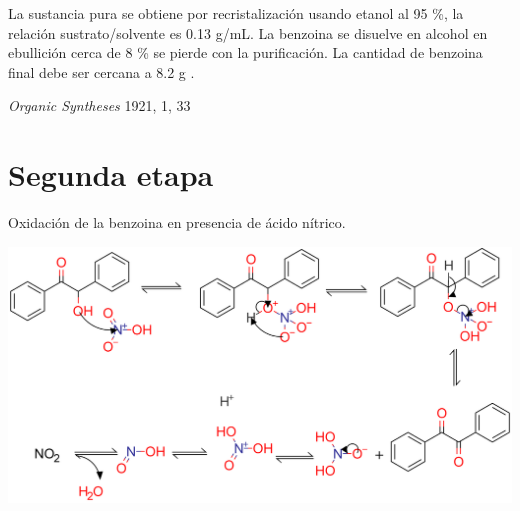 \documentclass[11pt, letterpage]{article}
\begin{document}
La sustancia pura se obtiene por recristalizaci\'on usando etanol al 95 \%, la relaci\'on sustrato/solvente es 0.13 g/mL. La benzoina se disuelve en alcohol en ebullici\'on cerca de 8 \% se pierde con la purificaci\'on. La cantidad de benzoina final debe ser cercana a 8.2 g \cite{Benzoin}.


\begin{thebibliography}{9}
	\textit{Organic Syntheses} 1921, 1, 33
\end{thebibliography}

\pagebreak
\section{Segunda etapa}
\begin{scheme}[h]
	\centering
	\caption{Oxidaci\'on de la benzoina en presencia de \'acido n\'itrico.}
	\includegraphics[width=0.8\linewidth]{mechanism-oxidation.png}
\end{scheme}
\end{document}
